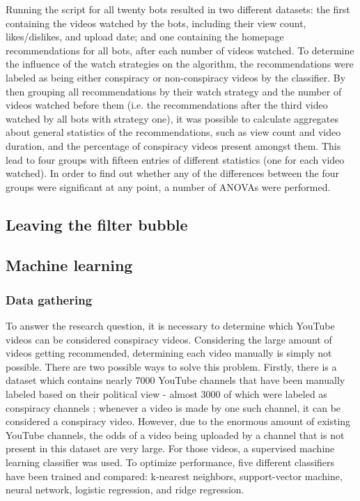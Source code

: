\documentclass[../main.tex]{subfiles}
\begin{document}
\vspace{0.25in}

\noindent Running the script for all twenty bots resulted in two different datasets: the first containing
the videos watched by the bots, including their view count, likes/dislikes, and upload date; and one 
containing the homepage recommendations for all bots, after each number of videos watched.
To determine the influence of the watch strategies on the algorithm, the recommendations were labeled as 
being either conspiracy or non-conspiracy videos by the classifier. By then grouping all recommendations 
by their watch strategy and the number of videos watched before them (i.e. the recommendations after the 
third video watched by all bots with strategy one), it was possible to calculate aggregates about general
statistics of the recommendations, such as view count and video duration, and the percentage of 
conspiracy videos present amongst them. This lead to four groups with fifteen entries of different 
statistics (one for each video watched). In order to find out whether any of the differences between the 
four groups were significant at any point, a number of ANOVAs were performed. 

\linenumbers

\subsection{Leaving the filter bubble}

\subsection{Machine learning}
\subsubsection{Data gathering}
To answer the research question, it is necessary to determine which YouTube videos can be considered
conspiracy videos. Considering the large amount of videos getting recommended, determining each video
manually is simply not possible. There are two possible ways to solve this problem. Firstly, there is a
dataset which contains nearly 7000 YouTube channels that have been manually labeled based on their
political view - almost 3000 of which were labeled as conspiracy channels \citep{ledwich2019algorithmic};
whenever a video is made by one such channel, it can be considered a conspiracy video. However, due to
the enormous amount of existing YouTube channels, the odds of a video being uploaded by a channel that
is not present in this dataset are very large. For those videos, a supervised machine learning
classifier was used. To optimize performance, five different classifiers have been trained and compared:
k-nearest neighbors, support-vector machine, neural network, logistic regression, and ridge regression. 
\end{document}
